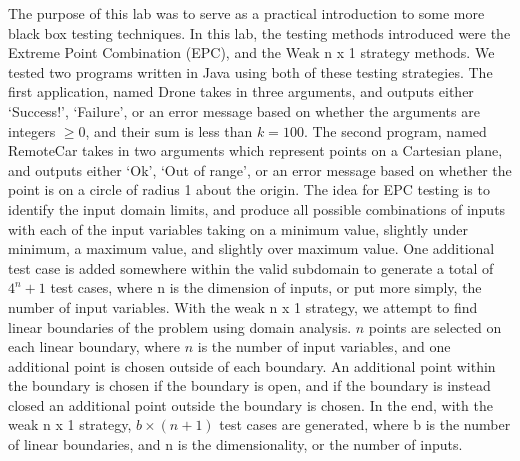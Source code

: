 The purpose of this lab was to serve as a practical
introduction to some more black box testing techniques. In this lab, the
testing methods introduced were the Extreme Point Combination (EPC), and the
Weak n x 1 strategy methods. We tested two programs written in Java using both
of these testing strategies. The first application, named Drone takes in three
arguments, and outputs either `Success!', `Failure', or an error message based
on whether the arguments are integers $\geq 0$, and their sum is less than
$k=100$. The second program, named RemoteCar takes in two arguments which
represent points on a Cartesian plane, and outputs either `Ok', `Out of range',
or an error message based on whether the point is on a circle of radius 1 about
the origin. The idea for EPC testing is to identify the input domain limits,
and produce all possible combinations of inputs with each of the input
variables taking on a minimum value, slightly under minimum, a maximum value,
and slightly over maximum value. One additional test case is added somewhere
within the valid subdomain to generate a total of $4^n + 1$ test cases, where
n is the dimension of inputs, or put more simply, the number of input
variables. With the weak n x 1 strategy, we attempt to find linear boundaries
of the problem using domain analysis. $n$ points are selected on each linear
boundary, where $n$ is the number of input variables, and one additional point
is chosen outside of each boundary. An additional point within the boundary is
chosen if the boundary is open, and if the boundary is instead closed an
additional point outside the boundary is chosen. In the end, with the weak
n x 1 strategy, $b \times (n + 1)$ test cases are generated, where b is the
number of linear boundaries, and n is the dimensionality, or the number of
inputs. 

